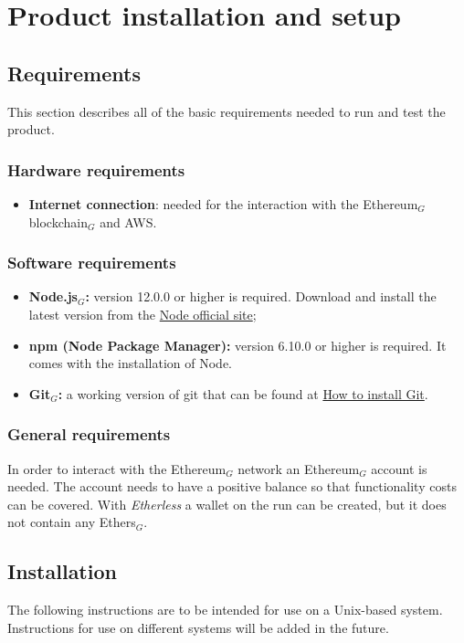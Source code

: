 \section{Product installation and setup}
  \subsection{Requirements}
    This section describes all of the basic requirements needed to run and test the product.
    \subsubsection{Hardware requirements}
      \begin{itemize}
      	\item \textbf{Internet connection}: needed for the interaction with the Ethereum$_{G}$ blockchain$_{G}$ and AWS.
      \end{itemize}
    \subsubsection{Software requirements}
      \begin{itemize}
        \item \textbf{Node.js$_{G}$:} version 12.0.0 or higher is required. Download and install the latest version from the \href{https://nodejs.org/it/download/}{Node official site};
        \item \textbf{npm (Node Package Manager):} version 6.10.0 or higher is required. It comes with the installation of Node.
        \item \textbf{Git$_{G}$:} a working version of git that can be found at \href{https://git-scm.com/book/en/v2/Getting-Started-Installing-Git}{How to install Git}.
      \end{itemize}
    \subsubsection{General requirements}
      In order to interact with the Ethereum$_{G}$ network an Ethereum$_{G}$ account is needed. The account needs to have a positive balance so that functionality costs can be covered. With \textit{Etherless} a wallet on the run can be created, but it does not contain any Ethers$_{G}$.
  \subsection{Installation}
    The following instructions are to be intended for use on a Unix-based system. Instructions for use on different systems will be added in the future.
